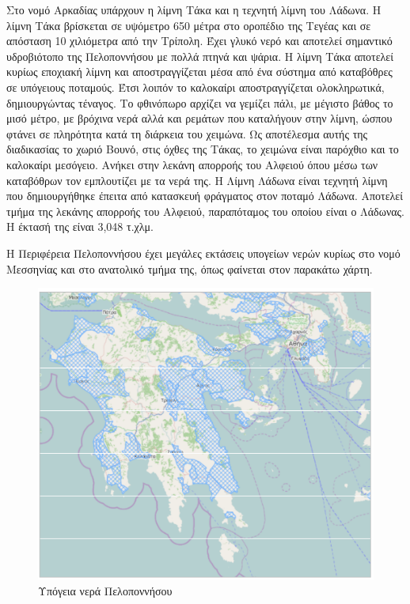 \documentclass[12pt]{article}
\begin{document}
	Στο νομό Αρκαδίας υπάρχουν η λίμνη Τάκα και η τεχνητή λίμνη του Λάδωνα. Η λίμνη Τάκα βρίσκεται σε υψόμετρο 650 μέτρα στο οροπέδιο της Τεγέας και σε απόσταση 10 χιλιόμετρα από την Τρίπολη. Έχει γλυκό νερό και αποτελεί σημαντικό υδροβιότοπο της Πελοποννήσου με πολλά πτηνά και ψάρια. Η λίμνη Τάκα αποτελεί κυρίως εποχιακή λίμνη και αποστραγγίζεται μέσα από ένα σύστημα από καταβόθρες σε υπόγειους ποταμούς. Έτσι λοιπόν το καλοκαίρι αποστραγγίζεται ολοκληρωτικά, δημιουργώντας τέναγος. Το φθινόπωρο αρχίζει να γεμίζει πάλι, με μέγιστο βάθος το μισό μέτρο, με βρόχινα νερά αλλά και ρεμάτων που καταλήγουν στην λίμνη, ώσπου φτάνει σε πληρότητα κατά τη διάρκεια του χειμώνα. Ως αποτέλεσμα αυτής της διαδικασίας το χωριό Βουνό, στις όχθες της Τάκας, το χειμώνα είναι παρόχθιο και το καλοκαίρι μεσόγειο. Ανήκει στην λεκάνη απορροής του Αλφειού όπου μέσω των καταβόθρων τον εμπλουτίζει με τα νερά της. Η Λίμνη Λάδωνα είναι τεχνητή λίμνη που δημιουργήθηκε έπειτα από κατασκευή φράγματος στον ποταμό Λάδωνα. Αποτελεί τμήμα της λεκάνης απορροής του Αλφειού, παραπόταμος του οποίου είναι ο Λάδωνας. Η έκτασή της είναι 3,048 τ.χλμ.
	
	Η Περιφέρεια Πελοποννήσου έχει μεγάλες εκτάσεις υπογείων νερών κυρίως στο νομό Μεσσηνίας και στο ανατολικό τμήμα της, όπως φαίνεται στον παρακάτω χάρτη. 
	
	\begin{figure} [H]
		\begin{center}
			\includegraphics [scale = 0.75] {ypogeia.png}
			\caption{Υπόγεια νερά Πελοποννήσου}
			\label{ypogeia}
		\end{center}
	\end{figure}
	
\end{document}
